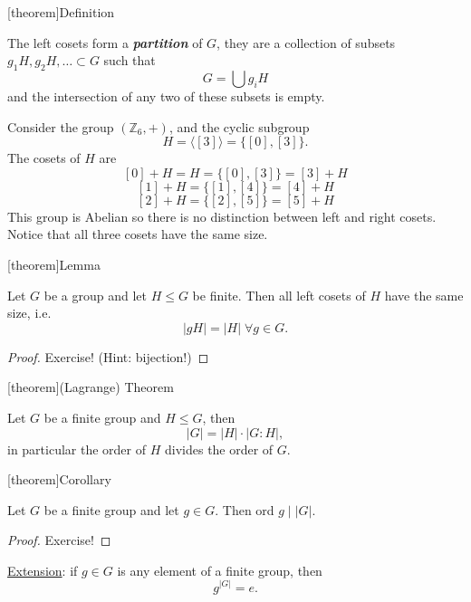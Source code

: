 \documentclass[12pt]{report}
\theoremstyle{definition}
\begin{document}
[theorem]{Definition}
\begin{partition of G}
    The left cosets form a \textbf{\emph{partition}} of $G$, they are a collection of subsets
    $g_1H, g_2H,\ldots \subset G$ such that \[
        G = \bigcup g_i H
    \]and the intersection of any two of these subsets is empty.
\end{partition of G}

\begin{ex}
    Consider the group $(\mathbb{Z}_6, +)$, and the cyclic subgroup\[
        H = \langle [3] \rangle = \{[0],[3]\}.
    \]The cosets of $H$ are \[
    [0] + H = H = \{[0],[3]\} = [3] + H
    \]\[
    [1] + H = \{[1],[4]\} = [4] + H
    \]\[
    [2] + H = \{[2],[5]\} = [5] + H
    \]
    This group is Abelian so there is no distinction between left and right cosets.
    Notice that all three cosets have the same size.
\end{ex}

[theorem]{Lemma}
\begin{size of left coset}
    Let $G$ be a group and let $H \le G$ be finite.
    Then all left cosets of $H$ have the same size, i.e.\ \[
        |gH| = |H| \;\forall g \in G.
    \]
\end{size of left coset}

\begin{proof}
    Exercise! (Hint: bijection!)
\end{proof}

[theorem]{(Lagrange) Theorem}
\begin{Lagrange Theorem}
    Let $G$ be a finite group and $H \le G$, then\[
    |G| = |H| \cdot |G:H|,
    \]
    in particular the order of $H$ divides the order of $G$.
\end{Lagrange Theorem}

[theorem]{Corollary}
\begin{order of g divides order of G}
    Let $G$ be a finite group and let $g \in G$. Then ord $g \; | \; |G| $.
\end{order of g divides order of G}

\begin{proof}
    Exercise!
\end{proof}

\underline{Extension}: if $g \in G$ is any element of a finite group, then\[
    g^{|G|} = e.
\]
\end{document}
